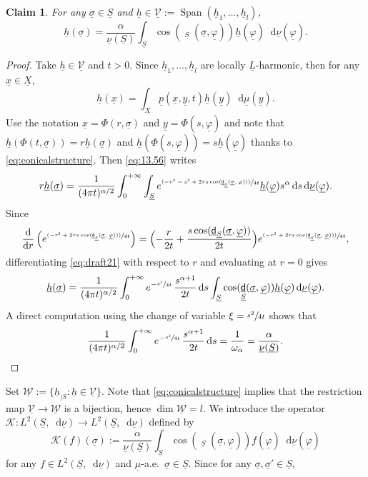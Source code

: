 \documentclass[10pt]{amsart}
\newcommand{\psfrac}[2]{\sfrac{(#1)}{#2}}
\let\sep:
\theoremstyle{plain}
\newtheorem{claim}[theorem]{Claim}
\theoremstyle{definition}
\newcommand{\ucV}{\underline{\mathcal{V}}}
\newcommand{\cW}{\underline{\mathcal{W}}}
\let\phi\varphi
\newcommand{\di}{\mathop{}\!\mathrm{d}}
\newcommand{\dist}{\mathsf{d}}
\DeclareMathOperator{\Span}{Span}
\newcommand{\uX}{\underline{X}}
\newcommand{\usigma}{\underline{\sigma}}
\DeclareMathOperator{\udist}{\underline{\dist}}
\newcommand{\ux}{\underline{x}}
\newcommand{\uL}{\underline{L}}
\newcommand{\uphi}{\underline{\phi}}
\newcommand{\uS}{\underline{S}}
\newcommand{\umu}{\underline{\mu}}
\newcommand{\unu}{\underline{\nu}}
\newcommand{\uy}{\underline{y}}
\newcommand{\upp}{\underline{p}}
\newcommand{\uh}{\underline{h}}
\begin{document}
\begin{claim}
For any $\usigma \in \uS$ and $\uh \in \ucV:=\Span(\uh_1,\dots,\uh_l)$,
\begin{equation}\label{proK}
\uh(\usigma) = \frac{\alpha}{\unu(\uS)} \int_{\uS} \cos(\udist_{\uS}(\usigma,\uphi)) \uh(\uphi) \di \unu(\uphi).
\end{equation}
\end{claim}

\begin{proof}
Take $\uh \in \ucV$ and $t>0$. Since $\uh_1,\dots,\uh_l$ are locally $\uL$-harmonic, then for any $\ux \in \uX$,
\begin{equation}\label{eq:13.56}
\uh(\ux) = \int_{\uX} \upp(\ux,\uy,t)\uh(\uy)\di\umu(\uy).
\end{equation}
Use the notation $\ux = \Phi(r,\usigma)$ and $\uy=\Phi(s,\uphi)$ and note that $\uh(\Phi(t,\usigma)) = r \uh(\usigma)$ and $\uh(\Phi(s,\uphi)) = s \uh(\uphi)$ thanks to \eqref{eq:conicalstructure}. Then \eqref{eq:13.56} writes
\begin{equation}\label{eq:draft21}
r \uh(\usigma)=\frac{1}{(4\pi t)^{\alpha/2}}\int_0^{+\infty} \int_{\uS} e^{\psfrac{-r^2-s^2+2rs\cos(\udist_{\uS}(\usigma,\phi))}{4t}}\uh(\uphi)s^\alpha\di s \di \unu(\uphi).
\end{equation}
Since
\[
\frac{\di}{\di r} \left(e^{\psfrac{-r^2+2rs\cos(\udist_{\uS}(\usigma,\uphi))}{4t}}\right) = \Bigl(- \frac{r}{2t} + \frac{s\cos(\udist_{\uS}(\usigma,\uphi))}{2t}\Bigr)e^{\psfrac{-r^2+2rs\cos(\udist_{\uS}(\usigma,\uphi))}{4t}},
\]
differentiating \eqref{eq:draft21} with respect to $r$ and evaluating at $r=0$ gives
\[
\uh(\usigma) = \frac{1}{(4\pi t)^{\alpha/2}} \int_0^{+\infty} e^{-\sfrac{s^2}{4t}}\,\frac{s^{\alpha+1}}{2t} \di s \int_{\uS} \cos(\udist_{\uS}(\usigma,\uphi)) \uh(\uphi) \di \unu(\uphi).
\]
A direct computation using the change of variable $\xi=\sfrac{s^2}{4t}$ shows that
\[
\frac{1}{(4\pi t)^{\alpha/2}} \int_0^{+\infty} e^{-\sfrac{s^2}{4t}}\,\frac{s^{\alpha+1}}{2t} \di s = \frac{1}{\omega_\alpha} = \frac{\alpha}{\unu(\uS)}.\qedhere
\]
\end{proof}
Set $\cW:=\{\uh_{|S} \sep \uh \in \ucV\}$. Note that \eqref{eq:conicalstructure} implies that the restriction map $\ucV\to \cW$ is a bijection, hence $\dim \cW=l$. We introduce the operator
$\mathcal{K}\colon L^2(\uS,\di\unu)\to L^2(\uS,\di\unu)$ defined by
\[
\mathcal{K}(f)(\usigma):= \frac{\alpha}{\unu(\uS)} \int_{\uS} \cos(\udist_{\uS}(\usigma,\uphi)) f(\uphi) \di \unu(\uphi)
\]
for any $f \in L^2(\uS,\di\unu)$ and $\umu$-a.e.\ $\usigma \in \uS$. Since for any $\usigma,\usigma' \in \uS$,
\end{document}
